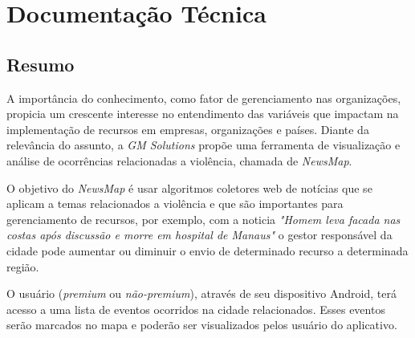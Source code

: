 \documentclass[
	12pt,				%
	openright,			%
	twoside,			%
	a4paper,			%
	english,			%
	french,				%
	spanish,			%
	brazil,				%
	]{abntex2}
\begin{document}

\frenchspacing 


\imprimircapa

\imprimirfolhaderosto*

\setlength{\absparsep}{18pt} %


\tableofcontents*
\cleardoublepage

\part{Documentação Técnica}


\chapter{Resumo}

A importância do conhecimento, como fator de gerenciamento nas organizações, propicia um crescente interesse no entendimento das variáveis que impactam na implementação de recursos em empresas, organizações e países. Diante da relevância do assunto, a \textit{GM Solutions} propõe uma ferramenta de visualização e análise de ocorrências relacionadas a violência, chamada de \textit{NewsMap}. 

O objetivo do \textit{NewsMap} é  usar algoritmos coletores web de notícias que se aplicam a temas relacionados a violência e que são importantes para gerenciamento de recursos, por exemplo, com a noticia \textit{"Homem leva facada nas costas após discussão e morre em hospital de Manaus"} o gestor responsável da cidade pode aumentar ou diminuir o envio de determinado recurso a determinada região.

O usuário (\textit{premium} ou \textit{não-premium}), através de seu dispositivo Android, terá acesso a uma lista de eventos ocorridos na cidade relacionados. Esses eventos serão marcados no mapa e poderão ser visualizados pelos usuário do aplicativo.
\end{document}
